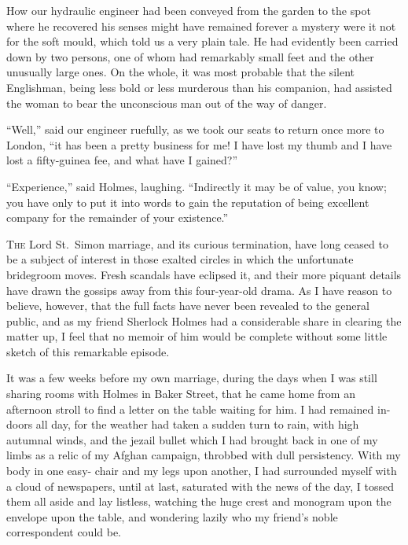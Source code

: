 How our hydraulic engineer had been conveyed from the
garden to the spot where he recovered his senses might have
remained forever a mystery were it not for the soft mould,
which told us a very plain tale. He had evidently been carried
down by two persons, one of whom had remarkably small
feet and the other unusually large ones. On the whole, it was
most probable that the silent Englishman, being less bold or
less murderous than his companion, had assisted the woman
to bear the unconscious man out of the way of danger.

“Well,” said our engineer ruefully, as we took our seats to
return once more to London, “it has been a pretty business
for me! I have lost my thumb and I have lost a fifty-guinea
fee, and what have I gained?”

“Experience,” said Holmes, laughing. “Indirectly it may
be of value, you know; you have only to put it into words to
gain the reputation of being excellent company for the remainder
of your existence.”


\textsc{The} Lord St.~Simon marriage, and its curious termination,
have long ceased to be a subject of interest
in those exalted circles in which the unfortunate
bridegroom moves. Fresh scandals have
eclipsed it, and their more piquant details have drawn the
gossips away from this four-year-old drama. As I have reason
to believe, however, that the full facts have never been
revealed to the general public, and as my friend Sherlock
Holmes had a considerable share in clearing the matter up,
I feel that no memoir of him would be complete without some
little sketch of this remarkable episode.

It was a few weeks before my own marriage, during the
days when I was still sharing rooms with Holmes in Baker
Street, that he came home from an afternoon stroll to find a
letter on the table waiting for him. I had remained in-doors
all day, for the weather had taken a sudden turn to rain, with
high autumnal winds, and the jezail bullet which I had brought
back in one of my limbs as a relic of my Afghan campaign,
throbbed with dull persistency. With my body in one easy-%
chair and my legs upon another, I had surrounded myself
with a cloud of newspapers, until at last, saturated with the
news of the day, I tossed them all aside and lay listless,
watching the huge crest and monogram upon the envelope
upon the table, and wondering lazily who my friend’s noble
correspondent could be.

